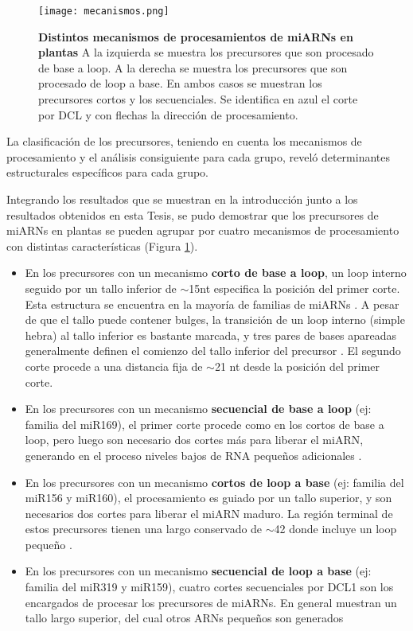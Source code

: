 \begin{figure}[htbp!] 
    \centering    
    \texttt{[image: mecanismos.png]}
    \caption[Mecanismos de procesamiento]{
    \textbf{Distintos mecanismos de procesamientos de miARNs en plantas}
    A la izquierda se muestra los precursores que son procesado de base a loop.
    A la derecha se muestra los precursores que son procesado de loop a base.
    En ambos casos se muestran los precursores cortos y los secuenciales.
    Se identifica en azul el corte por DCL y con flechas la dirección de procesamiento.
        }
    \label{fig:mecanismos}
\end{figure}

La clasificación de los precursores, teniendo en cuenta los mecanismos de procesamiento y el análisis consiguiente para cada grupo, reveló determinantes estructurales específicos para cada grupo.

Integrando los resultados que se muestran en la introducción junto a los resultados obtenidos en esta Tesis, se pudo demostrar que los precursores de miARNs en plantas se pueden agrupar por cuatro mecanismos de procesamiento con distintas características (Figura \ref{fig:mecanismos}).

\begin{itemize}
    \item En los precursores con un mecanismo \textbf{corto de base a loop}, un loop interno seguido por un tallo inferior de $\sim$15nt especifica la posición del primer corte.
        Esta estructura se encuentra en la mayoría de familias de miARNs \citep{Mateos2010,pmid20015653,pmid20015654}.
        A pesar de que el tallo puede contener bulges, la transición de un loop interno (simple hebra) al tallo inferior es bastante marcada, y tres pares de bases apareadas generalmente definen el comienzo del tallo inferior del precursor \citep{Bologna2013}.
        El segundo corte procede a una distancia fija de $\sim$21 nt desde la posición del primer corte.
    \item En los precursores con un mecanismo \textbf{secuencial de base a loop} (ej: familia del miR169), el primer corte procede como en los cortos de base a loop, pero luego son necesario dos cortes más para liberar el miARN, generando en el proceso niveles bajos de RNA pequeños adicionales \citep{Bologna2013}.
    \item En los precursores con un mecanismo \textbf{cortos de loop a base} (ej: familia del miR156 y miR160), el procesamiento es guiado por un tallo superior, y son necesarios dos cortes para liberar el miARN maduro.
        La región terminal de estos precursores tienen una largo conservado de $\sim$42 donde incluye un loop pequeño \citep{Bologna2013}.
    \item En los precursores con un mecanismo \textbf{secuencial de loop a base} (ej: familia del miR319 y miR159), cuatro cortes secuenciales por DCL1 son los encargados de procesar los precursores de miARNs.
        En general muestran un tallo largo superior, del cual otros ARNs pequeños son generados \citep{pmid19850910,Bologna2009,Bologna2013}
\end{itemize}


